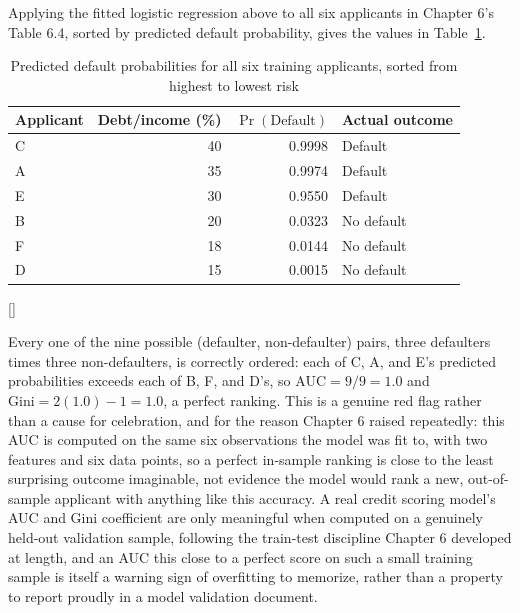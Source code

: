 \documentclass[../ai_in_finance]{subfiles}
\begin{document}
Applying the fitted logistic regression above to all six applicants in Chapter 6's Table 6.4, sorted by predicted default probability, gives the values in Table~\ref{tab:credit_auc}.

\begin{table}[htbp]
\centering
\begin{lrbox}{\bookmeasuredbox}
\begin{tabular}{lrrl}
\toprule
Applicant & Debt/income (\%) & $\Pr(\text{Default})$ & Actual outcome \\
\midrule
C & 40 & 0.9998 & Default \\
A & 35 & 0.9974 & Default \\
E & 30 & 0.9550 & Default \\
B & 20 & 0.0323 & No default \\
F & 18 & 0.0144 & No default \\
D & 15 & 0.0015 & No default \\
\bottomrule
\end{tabular}
\end{lrbox}
\ifdim\wd\bookmeasuredbox<0.65\linewidth
\setlength{\bookcapwidth}{0.65\linewidth}
\else
\setlength{\bookcapwidth}{\wd\bookmeasuredbox}
\fi
{}[\bookcapwidth]{
\usebox{\bookmeasuredbox}
}{
\caption{Predicted default probabilities for all six training applicants, sorted from highest to lowest risk}
\label{tab:credit_auc}
}
\end{table}

Every one of the nine possible (defaulter, non-defaulter) pairs, three defaulters times three non-defaulters, is correctly ordered: each of C, A, and E's predicted probabilities exceeds each of B, F, and D's, so $\text{AUC}=9/9=1.0$ and $\text{Gini}=2(1.0)-1=1.0$, a perfect ranking. This is a genuine red flag rather than a cause for celebration, and for the reason Chapter 6 raised repeatedly: this AUC is computed on the same six observations the model was fit to, with two features and six data points, so a perfect in-sample ranking is close to the least surprising outcome imaginable, not evidence the model would rank a new, out-of-sample applicant with anything like this accuracy.
A real credit scoring model's AUC and Gini coefficient are only meaningful when computed on a genuinely held-out validation sample, following the train-test discipline Chapter 6 developed at length, and an AUC this close to a perfect score on such a small training sample is itself a warning sign of overfitting to memorize, rather than a property to report proudly in a model validation document.
\end{document}
